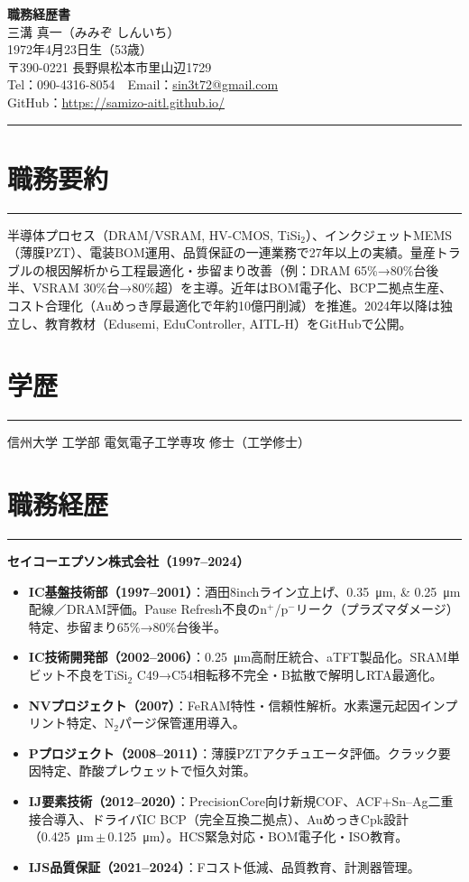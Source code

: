 \documentclass[11pt,ja=standard]{bxjsarticle}
\newcommand{\cvsection}[1]{\section*{#1}\vspace{-0.3em}\hrule\vspace{0.5em}}
\begin{document}
\begin{center}
{\Huge \textbf{職務経歴書}} \\[1.2em]
{\Large 三溝 真一（みみぞ しんいち）} \\[0.5em]
1972年4月23日生（53歳） \\[0.3em]
〒390-0221 長野県松本市里山辺1729 \\[0.3em]
Tel：090-4316-8054　Email：\href{mailto:sin3t72@gmail.com}{sin3t72@gmail.com} \\[0.3em]
GitHub：\href{https://samizo-aitl.github.io/}{https://samizo-aitl.github.io/}
\end{center}

\vspace{1em}
\hrule
\vspace{1em}

\cvsection{職務要約}
半導体プロセス（DRAM/VSRAM, HV-CMOS, TiSi$_2$）、インクジェットMEMS（薄膜PZT）、電装BOM運用、品質保証の一連業務で27年以上の実績。量産トラブルの根因解析から工程最適化・歩留まり改善（例：DRAM 65\%→80\%台後半、VSRAM 30\%台→80\%超）を主導。近年はBOM電子化、BCP二拠点生産、コスト合理化（Auめっき厚最適化で年約10億円削減）を推進。2024年以降は独立し、教育教材（Edusemi, EduController, AITL-H）をGitHubで公開。

\cvsection{学歴}
信州大学 工学部 電気電子工学専攻 修士（工学修士）

\cvsection{職務経歴}
\textbf{セイコーエプソン株式会社（1997--2024）}

\begin{itemize}
  \item \textbf{IC基盤技術部（1997--2001）}：酒田8inchライン立上げ、\SIlist{0.35;0.25}{\micro\metre}配線／DRAM評価。Pause Refresh不良のn$^+$/p$^-$リーク（プラズマダメージ）特定、歩留まり65\%→80\%台後半。
  \item \textbf{IC技術開発部（2002--2006）}：\SI{0.25}{\micro\metre}高耐圧統合、aTFT製品化。SRAM単ビット不良をTiSi$_2$ C49→C54相転移不完全・B拡散で解明しRTA最適化。
  \item \textbf{NVプロジェクト（2007）}：FeRAM特性・信頼性解析。水素還元起因インプリント特定、N$_2$パージ保管運用導入。
  \item \textbf{Pプロジェクト（2008--2011）}：薄膜PZTアクチュエータ評価。クラック要因特定、酢酸プレウェットで恒久対策。
  \item \textbf{IJ要素技術（2012--2020）}：PrecisionCore向け新規COF、ACF+Sn--Ag二重接合導入、ドライバIC BCP（完全互換二拠点）、AuめっきCpk設計（\SI{0.425}{\micro\metre}\,\(\pm\)\,\SI{0.125}{\micro\metre}）。HCS緊急対応・BOM電子化・ISO教育。
  \item \textbf{IJS品質保証（2021--2024）}：Fコスト低減、品質教育、計測器管理。
\end{itemize}
\end{document}
